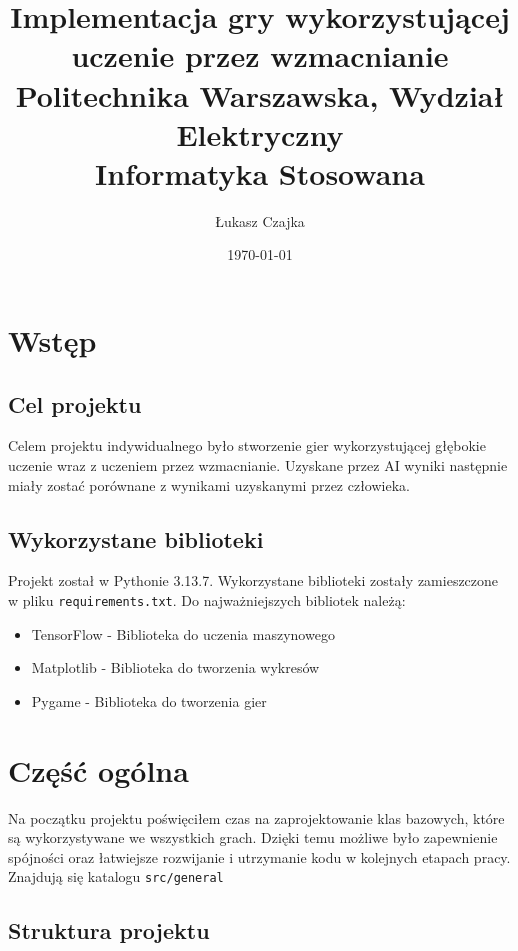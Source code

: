 \documentclass[12pt, draft]{report}
\title{
    {Implementacja gry wykorzystującej uczenie przez wzmacnianie}\\
    {\large Politechnika Warszawska, Wydział Elektryczny}\\
    {Informatyka Stosowana}
}
\author{Łukasz Czajka}
\date{\today}
\begin{document}
\maketitle
\tableofcontents
\listoftodos
\chapter{Wstęp}
\section{Cel projektu}
Celem projektu indywidualnego było stworzenie gier wykorzystującej głębokie uczenie wraz z uczeniem przez wzmacnianie. Uzyskane przez AI wyniki następnie miały zostać porównane z wynikami uzyskanymi przez człowieka.

\section{Wykorzystane biblioteki}
Projekt został w Pythonie 3.13.7. Wykorzystane biblioteki zostały zamieszczone w pliku \texttt{requirements.txt}. 
Do najważniejszych bibliotek należą:
\begin{itemize}
    \item TensorFlow - Biblioteka do uczenia maszynowego
    \item Matplotlib - Biblioteka do tworzenia wykresów
    \item Pygame - Biblioteka do tworzenia gier
\end{itemize}

\chapter{Część ogólna}
\label{sec:ogolne}

Na początku projektu poświęciłem czas na zaprojektowanie klas bazowych, które są wykorzystywane we wszystkich grach. Dzięki temu możliwe było zapewnienie spójności oraz łatwiejsze rozwijanie i utrzymanie kodu w kolejnych etapach pracy. Znajdują się katalogu \texttt{src/general}

\section{Struktura projektu}
\end{document}
